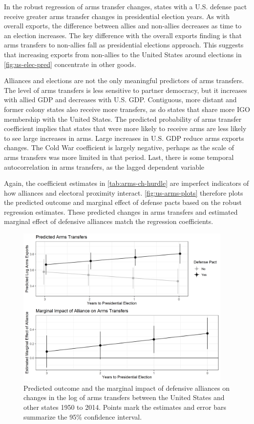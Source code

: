 \documentclass[12pt]{article}
\begin{document}
In the robust regression of arms transfer changes, states with a U.S. defense pact receive greater arms transfer changes in presidential election years. 
As with overall exports, the difference between allies and non-allies decreases as time to an election increases.
The key difference with the overall exports finding is that arms transfers to non-allies fall as presidential elections approach. 
This suggests that increasing exports from non-allies to the United States around elections in \autoref{fig:us-elec-pred} concentrate in other goods. 


Alliances and elections are not the only meaningful predictors of arms transfers.
The level of arms transfers is less sensitive to partner democracy, but it increases with allied GDP and decreases with U.S. GDP. 
Contiguous, more distant and former colony states also receive more transfers, as do states that share more IGO membership with the United States.
The predicted probability of arms transfer coefficient implies that states that were more likely to receive arms are less likely to see large increases in arms. 
Large increases in U.S. GDP reduce arms exports changes. 
The Cold War coefficient is largely negative, perhaps as the scale of arms transfers was more limited in that period. 
Last, there is some temporal autocorrelation in arms transfers, as the lagged dependent variable  


Again, the coefficient estimates in \autoref{tab:arms-ch-hurdle} are imperfect indicators of how alliances and electoral proximity interact.
\autoref{fig:us-arms-plots} therefore plots the predicted outcome and marginal effect of defense pacts based on the robust regression estimates.
These predicted changes in arms transfers and estimated marginal effect of defensive alliances match the regression coefficients.


\begin{figure}[htpb]
	\centering
		\includegraphics[width=0.95\textwidth]{../figures/us-arms-plots.png}
	\caption{Predicted outcome and the marginal impact of defensive alliances on changes in the log of arms transfers between the United States and other states 1950 to 2014. Points mark the estimates and error bars summarize the 95\% confidence interval.}
	\label{fig:us-arms-plots}
\end{figure}
\end{document}
